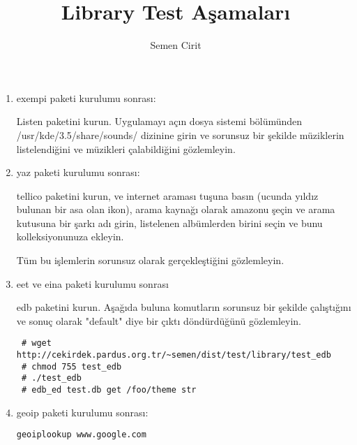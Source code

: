 \documentclass[a4paper,10pt]{article}
\title{Library Test Aşamaları}
\author{Semen Cirit}
\begin{document}
\maketitle
\begin{enumerate}
\item exempi paketi kurulumu sonrası:

Listen paketini kurun. Uygulamayı açın dosya sistemi bölümünden /usr/kde/3.5/share/sounds/ dizinine girin ve sorunsuz bir şekilde müziklerin listelendiğini ve müzikleri çalabildiğini gözlemleyin.

\item yaz paketi kurulumu sonrası:

tellico paketini kurun, ve internet araması tuşuna basın (ucunda yıldız bulunan bir asa olan ikon), arama kaynağı olarak amazonu şeçin ve arama kutusuna bir şarkı adı girin, listelenen albümlerden birini seçin ve bunu kolleksiyonunuza ekleyin. 

Tüm bu işlemlerin sorunsuz olarak gerçekleştiğini gözlemleyin.


\item eet ve eina paketi kurulumu sonrası

edb paketini kurun. Aşağıda buluna komutların sorunsuz bir şekilde çalıştığını ve sonuç olarak "default" diye bir çıktı döndürdüğünü gözlemleyin.
\begin{verbatim}
 # wget http://cekirdek.pardus.org.tr/~semen/dist/test/library/test_edb
 # chmod 755 test_edb
 # ./test_edb
 # edb_ed test.db get /foo/theme str
\end{verbatim}

\item geoip paketi kurulumu sonrası:
\begin{verbatim}
geoiplookup www.google.com 
\end{verbatim}

\end{enumerate}
\end{document}
